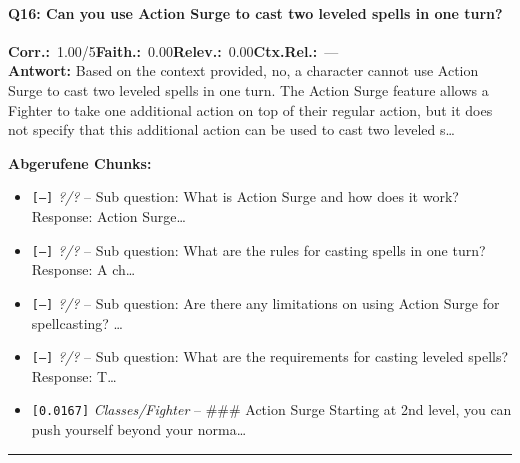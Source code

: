 \paragraph{Q16: Can you use Action Surge to cast two leveled spells in one turn?}
\noindent \textbf{Corr.:}~1.00/5\quad \textbf{Faith.:}~0.00\quad \textbf{Relev.:}~0.00\quad \textbf{Ctx.Rel.:}~—\\

\noindent\textbf{Antwort:} Based on the context provided, no, a character cannot use Action Surge to cast two leveled spells in one turn. The Action Surge feature allows a Fighter to take one additional action on top of their regular action, but it does not specify that this additional action can be used to cast two leveled s\ldots

\noindent\textbf{Abgerufene Chunks:}
\begin{itemize}[noitemsep, topsep=2pt]
  \item[\textbf{\#1}] \texttt{[—]} \textit{?/?} -- Sub question: What is Action Surge and how does it work? Response:  Action Surge\ldots
  \item[\textbf{\#2}] \texttt{[—]} \textit{?/?} -- Sub question: What are the rules for casting spells in one turn? Response:  A ch\ldots
  \item[\textbf{\#3}] \texttt{[—]} \textit{?/?} -- Sub question: Are there any limitations on using Action Surge for spellcasting? \ldots
  \item[\textbf{\#4}] \texttt{[—]} \textit{?/?} -- Sub question: What are the requirements for casting leveled spells? Response:  T\ldots
  \item[\textbf{\#5}] \texttt{[0.0167]} \textit{Classes/Fighter} -- \#\#\# Action Surge  Starting at 2nd level, you can push yourself beyond your norma\ldots
\end{itemize}
\vspace{4pt}
\hrule
\vspace{6pt}
